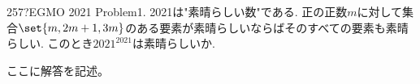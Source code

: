 \begin{prob}{257}{\hosi ?}{EGMO 2021 Problem1.}
2021は"素晴らしい数"である. 正の正数$m$に対して集合$\set{m,2m+1,3m}$のある要素が素晴らしいならばそのすべての要素も素晴らしい. このとき$2021^{2021}$は素晴らしいか.
\end{prob}
ここに解答を記述。
